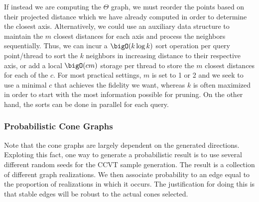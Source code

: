 If instead we are computing the $\Theta$ graph, we must reorder the points based on their projected distance which we have already computed in order to determine the closest axis.
%
Alternatively, we could use an auxiliary data structure to maintain the $m$ closest distances for each axis and process the neighbors sequentially.
%
Thus, we can incur a $\bigO(k \log k)$ sort operation per query point/thread to sort the $k$ neighbors in increasing distance to their respective axis, or add a local $\bigO(cm)$ storage per thread to store the $m$ closest distances for each of the $c$.
%
For most practical settings, $m$ is set to 1 or 2 and we seek to use a minimal $c$ that achieves the fidelity we want, whereas $k$ is often maximized in order to start with the most information possible for pruning.
%
On the other hand, the sorts can be done in parallel for each query.
%

\subsubsection{Probabilistic Cone Graphs}

Note that the cone graphs are largely dependent on the generated directions.
%
Exploting this fact, one way to generate a probabilistic result is to use several different random seeds for the CCVT sample generation.
%
The result is a collection of different graph realizations.
%
We then associate probability to an edge equal to the proportion of realizations in which it occurs.
%
The justification for doing this is that stable edges will be robust to the actual cones selected.


